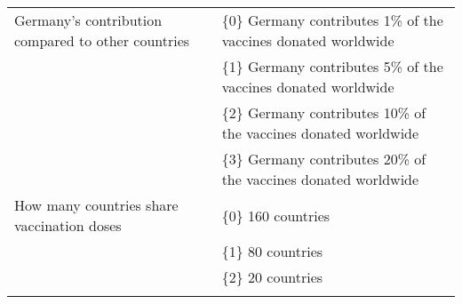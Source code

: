 \documentclass[12pt,oneside,smallheadings,chapterprefix=true]{article}
\begin{document}
\begin{longtable}[]{@{}ll@{}}
\begin{minipage}[t]{0.40\columnwidth}
Germany's contribution compared to other countries\strut
\end{minipage} & \begin{minipage}[t]{0.54\columnwidth}\raggedright
\{0\} Germany contributes 1\% of the vaccines donated worldwide\strut
\end{minipage}\tabularnewline
\begin{minipage}[t]{0.40\columnwidth}\raggedright
\strut
\end{minipage} & \begin{minipage}[t]{0.54\columnwidth}\raggedright
\{1\} Germany contributes 5\% of the vaccines donated worldwide\strut
\end{minipage}\tabularnewline
\begin{minipage}[t]{0.40\columnwidth}\raggedright
\strut
\end{minipage} & \begin{minipage}[t]{0.54\columnwidth}\raggedright
\{2\} Germany contributes 10\% of the vaccines donated worldwide\strut
\end{minipage}\tabularnewline
\begin{minipage}[t]{0.40\columnwidth}\raggedright
\strut
\end{minipage} & \begin{minipage}[t]{0.54\columnwidth}\raggedright
\{3\} Germany contributes 20\% of the vaccines donated worldwide\strut
\end{minipage}\tabularnewline
\begin{minipage}[t]{0.40\columnwidth}\raggedright
How many countries share vaccination doses\strut
\end{minipage} & \begin{minipage}[t]{0.54\columnwidth}\raggedright
\{0\} 160 countries\strut
\end{minipage}\tabularnewline
\begin{minipage}[t]{0.40\columnwidth}\raggedright
\strut
\end{minipage} & \begin{minipage}[t]{0.54\columnwidth}\raggedright
\{1\} 80 countries\strut
\end{minipage}\tabularnewline
\begin{minipage}[t]{0.40\columnwidth}\raggedright
\strut
\end{minipage} & \begin{minipage}[t]{0.54\columnwidth}\raggedright
\{2\} 20 countries\strut
\end{minipage}\tabularnewline
\begin{minipage}[t]{0.40\columnwidth}\raggedright

\end{minipage}
\end{longtable}
\end{document}
